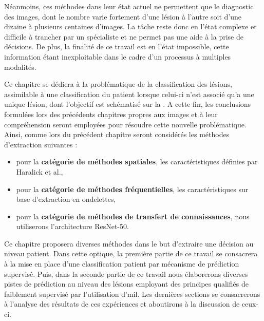Néanmoins, ces méthodes dans leur état actuel ne permettent que le diagnostic des images, dont le nombre varie fortement d'une lésion à l'autre soit d'une dizaine à plusieurs centaines d'images. La tâche reste donc en l'état complexe et difficile à trancher par un spécialiste et ne permet pas une aide à la prise de décisions. De plus, la finalité de ce travail est en l'état impossible, cette information étant inexploitable dans le cadre d'un processus à multiples modalités.\par

Ce chapitre se dédiera à la problématique de la classification des lésions, assimilable à une classification du patient lorsque celui-ci n'est associé qu'a une unique lésion, dont l'objectif est schématisé sur la . A cette fin, les conclusions formulées lors des précédents chapitres propres aux images et à leur compréhension seront employées pour résoudre cette nouvelle problématique. Ainsi, comme lors du précédent chapitre seront considérés les méthodes d'extraction suivantes :
\begin{itemize}
    \item pour la \textbf{catégorie de méthodes spatiales}, les caractéristiques définies par Haralick et al.\cite{Haralick1973},
    \item pour la \textbf{catégorie de méthodes fréquentielles}, les caractéristiques sur base d'extraction en ondelettes,
    \item pour la \textbf{catégorie de méthodes de transfert de connaissances}, nous utiliserons l'architecture ResNet-50.
\end{itemize}\par\par

Ce chapitre proposera diverses méthodes dans le but d'extraire une décision au niveau patient. Dans cette optique, la première partie de ce travail se consacrera à la mise en place d'une classification patient par mécanisme de prédiction supervisé. Puis, dans la seconde partie de ce travail nous élaborerons diverses pistes de prédiction au niveau des lésions employant des principes qualifiés de faiblement supervisé par l'utilisation d'\gls{mil}. Les dernières sections se consacrerons à l'analyse des résultats de ces expériences et aboutirons à la discussion de ceux-ci.\par

